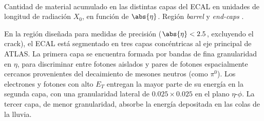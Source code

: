 \begin{marginfigure}[-12em]
    \centering
    \\
    \caption{Cantidad de material acumulado en las distintas capas del ECAL en unidades de longitud de radiación $X_0$, en función de $\abs{\eta}$. Región \textit{barrel}  y \textit{end-caps} .}
    \label{fig:ch2:atlas_calorimeters:material}
\end{marginfigure}

En la región diseñada para medidas de precisión ($\abs{\eta} < 2.5$, excluyendo el crack), el ECAL está segmentado en tres capas concéntricas al eje principal de ATLAS. La primera capa se encuentra formada por bandas de fina granularidad en $\eta$, para discriminar entre fotones aislados y pares de fotones espacialmente cercanos provenientes del decaimiento de mesones neutros (como $\pi^0$). Los electrones y fotones con alto $E_T$ entregan la mayor parte de su energía en la segunda capa, con una granularidad lateral de $0.025 \times 0.025$ en el plano $\eta$-$\phi$. La tercer capa, de menor granularidad, absorbe la energía depositada en las colas de la lluvia.

